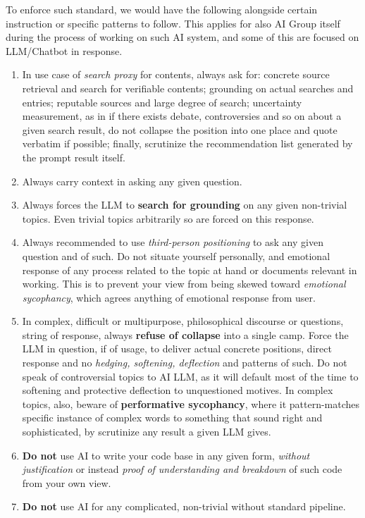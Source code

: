 \documentclass[10pt,a4paper]{article}
\begin{document}
To enforce such standard, we would have the following alongside certain instruction or specific patterns to follow. This applies for also AI Group itself during the process of working on such AI system, and some of this are focused on LLM/Chatbot in response. 
\begin{enumerate}
    \item In use case of \textit{search proxy} for contents, always ask for: concrete source retrieval and search for verifiable contents; grounding on actual searches and entries; reputable sources and large degree of search; uncertainty measurement, as in if there exists debate, controversies and so on about a given search result, do not collapse the position into one place and quote verbatim if possible; finally, scrutinize the recommendation list generated by the prompt result itself. 
    \item Always carry context in asking any given question. 
    \item Always forces the LLM to \textbf{search for grounding} on any given non-trivial topics. Even trivial topics arbitrarily so are forced on this response. 
    \item Always recommended to use \textit{third-person positioning} to ask any given question and of such. Do not situate yourself personally, and emotional response of any process related to the topic at hand or documents relevant in working. This is to prevent your view from being skewed toward \textit{emotional sycophancy}, which agrees anything of emotional response from user. 
    \item In complex, difficult or multipurpose, philosophical discourse or questions, string of response, always \textbf{refuse of collapse} into a single camp. Force the LLM in question, if of usage, to deliver actual concrete positions, direct response and no \textit{hedging, softening, deflection} and patterns of such. Do not speak of controversial topics to AI LLM, as it will default most of the time to softening and protective deflection to unquestioned motives. In complex topics, also, beware of \textbf{performative sycophancy}, where it pattern-matches specific instance of complex words to something that sound right and sophisticated, by scrutinize any result a given LLM gives. 
    \item \textbf{Do not} use AI to write your code base in any given form, \textit{without justification} or instead \textit{proof of understanding and breakdown} of such code from your own view. 
    \item \textbf{Do not} use AI for any complicated, non-trivial without standard pipeline. 

\end{enumerate}
\end{document}
